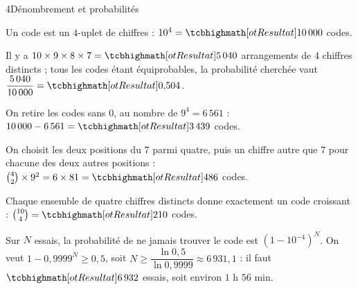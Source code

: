 

\begin{corrigeBac}{4}{Dénombrement et probabilités}
\begin{questions}
  \item Un code est un $4$-uplet de chiffres : $10^{4}=\res{10\,000}$ codes. 
  \item Il y a $10\times9\times8\times7=\res{5\,040}$ arrangements de $4$ chiffres distincts ; tous les codes étant équiprobables, la
    probabilité cherchée vaut $\dfrac{5\,040}{10\,000}=\res{0{,}504}$. 
  \item On retire les codes sans $0$, au nombre de $9^{4}=6\,561$ : $10\,000-6\,561=\res{3\,439}$ codes. 
  \item On choisit les deux positions du $7$ parmi quatre, puis un chiffre autre que $7$ pour chacune des deux autres positions :
    $\binom42\times9^{2}=6\times81=\res{486}$ codes. 
  \item Chaque ensemble de quatre chiffres distincts donne exactement un code croissant : $\binom{10}{4}=\res{210}$ codes. 
  \item Sur $N$ essais, la probabilité de ne jamais trouver le code est $\left(1-10^{-4}\right)^{N}$. On veut
    $1-0{,}9999^{N}\geq0{,}5$, soit $N\geq\dfrac{\ln0{,}5}{\ln0{,}9999}\approx6\,931{,}1$ : il faut $\res{6\,932}$ essais, soit environ
    $1$ h $56$ min. 
\end{questions}
\end{corrigeBac}

